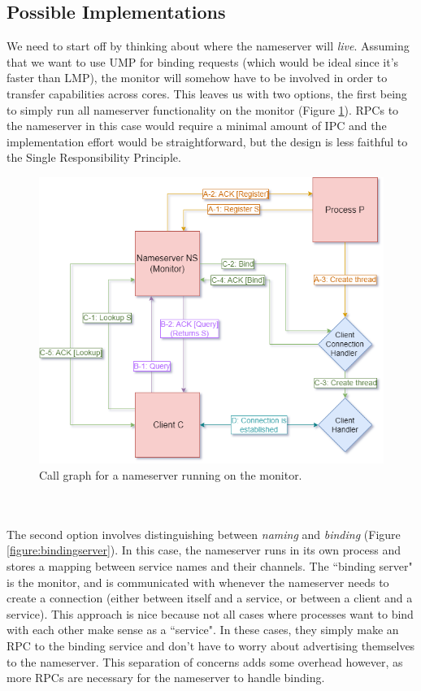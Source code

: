 \subsection{Possible Implementations}
We need to start off by thinking about where the nameserver will \textit{live}. Assuming that we want to use UMP for binding requests (which would be ideal since it's faster than LMP), the monitor will somehow have to be involved in order to transfer capabilities across cores. This leaves us with two options, the first being to simply run all nameserver functionality on the monitor (Figure \ref{figure:nameserver}). RPCs to the nameserver in this case would require a minimal amount of IPC and the implementation effort would be straightforward, but the design is less faithful to the Single Responsibility Principle.
\begin{figure}[ht]
    \centering
    \includegraphics[width=0.5\columnwidth]{images/nameserver.png}
    \caption{Call graph for a nameserver running on the monitor.}
    \label{figure:nameserver}
\end{figure}
\\\\
The second option involves distinguishing between \textit{naming} and \textit{binding} (Figure \ref{figure:bindingserver}). In this case, the nameserver runs in its own process and stores a mapping between service names and their channels. The ``binding server" is the monitor, and is communicated with whenever the nameserver needs to create a connection (either between itself and a service, or between a client and a service). This approach is nice because not all cases where processes want to bind with each other make sense as a ``service". In these cases, they simply make an RPC to the binding service and don't have to worry about advertising themselves to the nameserver. This separation of concerns adds some overhead however, as more RPCs are necessary for the nameserver to handle binding. 
